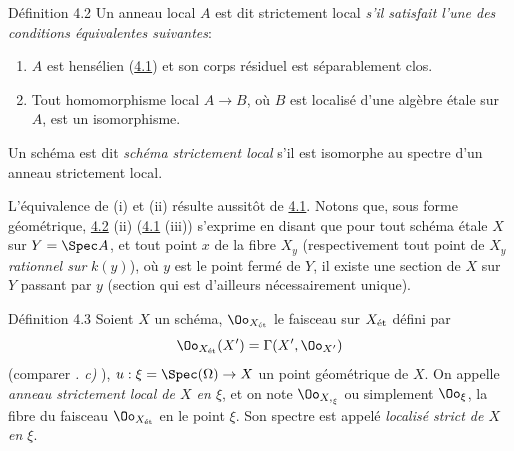 \documentclass[10pt]{../fichiers-configuration-latex/smfart}
\begin{document}
\begin{enonce*}{Définition 4.2}
Un anneau local $A$ est dit strictement local \emph{s'il satisfait
  l'une des conditions équivalentes suivantes}:
\begin{enumerate}
\renewcommand{\theenumi}{\roman{enumi}}
\renewcommand{\labelenumi}{(\theenumi)}
\item $A$ est hensélien (\hyperref[VIII.subsec4.1]{4.1})
et son corps résiduel est séparablement clos.

\item Tout homomorphisme local $A \to B$, où $B$ est localisé d'une
  algèbre étale sur $A$, est un isomorphisme.
\end{enumerate}

Un schéma est dit \emph{schéma strictement local} s'il est isomorphe au
spectre d'un anneau strictement local.
\end{enonce*}

L'équivalence de (i) et (ii) résulte aussitôt de \hyperref[VIII.subsec4.1]{4.1}.
Notons que, sous
forme géométrique, \hyperref[VIII.def4.2]{4.2} (ii) (\resp \hyperref[VIII.subsec4.1]{4.1} (iii))
s'exprime en disant que
pour tout schéma étale $X$ sur $Y = \Spec A$, et tout point $x$ de la
fibre $X_y$ (respectivement tout point de $X_y$ \emph{rationnel sur}
$k(y)$), où $y$ est le point fermé de $Y$, il existe une section de $X$
sur $Y$ passant par $y$ (section qui est d'ailleurs nécessairement
unique).

\begin{enonce*}{Définition 4.3}
Soient $X$ un schéma, $\Oo_{X_{\text{\rm ét}}}$ le faisceau sur
$X_{\text{\rm ét}}$ défini
par
$$
\Oo_{X_{\text{\rm ét}}} (X') = \Gamma (X', \Oo_{X'})
$$
(comparer \emph{. c)} ), $u : \xi = \Spec (\Omega) \to X$ un point
géométrique de $X$. On appelle \emph{anneau strictement local de $X$ en
$\xi$}, et on note $\Oo_{{X,}_{\xi}}$ ou simplement\pageoriginale
$\Oo_{\xi}$, la fibre du faisceau $\Oo_{X_{\text{\rm ét}}}$ en le
point $\xi$. Son spectre est
appelé \emph{localisé strict de $X$ en $\xi$}.
\end{enonce*}
\end{document}
